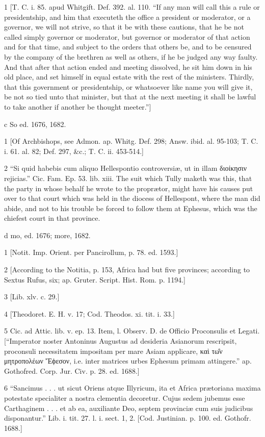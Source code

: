 1
[T. C. i. 85. apud Whitgift. Def. 392. al. 110. “If any man will call this a rule or presidentship, and him that executeth the office a president or moderator, or a governor, we will not strive, so that it be with these cautions, that he be not called simply governor or moderator, but governor or moderator of that action and for that time, and subject to the orders that others be, and to be censured by the company of the brethren as well as others, if he be judged any way faulty. And that after that action ended and meeting dissolved, he sit him down in his old place, and set himself in equal estate with the rest of the ministers. Thirdly, that this government or presidentship, or whatsoever like name you will give it, be not so tied unto that minister, but that at the next meeting it shall be lawful to take another if another be thought meeter.”]

c
So ed. 1676, 1682.

1
[Of Archbishops, see Admon. ap. Whitg. Def. 298; Answ. ibid. al. 95-103; T. C. i. 61. al. 82; Def. 297, &c.; T. C. ii. 453-514.]

2
“Si quid habebis cum aliquo Hellespontio controversiæ, ut in illam διοίκησιν rejicias.” Cic. Fam. Ep. 53. lib. xiii. The suit which Tully maketh was this, that the party in whose behalf he wrote to the proprætor, might have his causes put over to that court which was held in the diocess of Hellespont, where the man did abide, and not to his trouble be forced to follow them at Ephesus, which was the chiefest court in that province.

d
mo, ed. 1676; more, 1682.

1
[Notit. Imp. Orient. per Pancirollum, p. 78. ed. 1593.]

2
[According to the Notitia, p. 153, Africa had but five provinces; according to Sextus Rufus, six; ap. Gruter. Script. Hist. Rom. p. 1194.]

3
[Lib. xlv. c. 29.]

4
[Theodoret. E. H. v. 17; Cod. Theodos. xi. tit. i. 33.]

5
Cic. ad Attic. lib. v. ep. 13. Item, l. Observ. D. de Officio Proconsulis et Legati. [“Imperator noster Antoninus Augustus ad desideria Asianorum rescripsit, proconsuli necessitatem impositam per mare Asiam applicare, καὶ τω̑ν μητροπολέων Ἔϕεσον, i.e. inter matrices urbes Ephesum primam attingere.” ap. Gothofred. Corp. Jur. Civ. p. 28. ed. 1688.]

6
“Sancimus . . . ut sicut Oriens atque Illyricum, ita et Africa prætoriana maxima potestate specialiter a nostra clementia decoretur. Cujus sedem jubemus esse Carthaginem . . . et ab ea, auxiliante Deo, septem provinciæ cum suis judicibus disponantur.” Lib. i. tit. 27. l. i. sect. 1, 2. [Cod. Justinian. p. 100. ed. Gothofr. 1688.]

